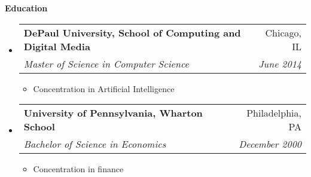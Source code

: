 \documentclass[letterpaper,10pt]{article}
\makeatletter
\newcommand{\resitem}[1]{\item #1 \vspace{-2pt}}
\newcommand{\resheading}[1]{{\large \colorbox{mygrey}{\begin{minipage}{\textwidth}{\textbf{#1 \vphantom{p\^{E}}}}\end{minipage}}}}
\newcommand{\ressubheading}[4]{
\begin{tabular*}{7.0in}{l@{\extracolsep{\fill}}r}
		\textbf{#1} & #2 \\
		\textit{#3} & \textit{#4} \\
\end{tabular*}\vspace{-6pt}}
\makeatother
\begin{document}
\resheading{Education}
\begin{itemize}
\item
	\ressubheading{DePaul University, School of Computing and Digital Media}{Chicago, IL}
	{Master of Science in Computer Science}{June 2014}
	\begin{itemize}
		\resitem{Concentration in Artificial Intelligence}
\end{itemize}
\item
	\ressubheading{University of Pennsylvania, Wharton School}{Philadelphia, PA}
	{Bachelor of Science in Economics}{December 2000}
	\begin{itemize}
		\resitem{Concentration in finance}
	\end{itemize}
\end{itemize}


\end{document}
